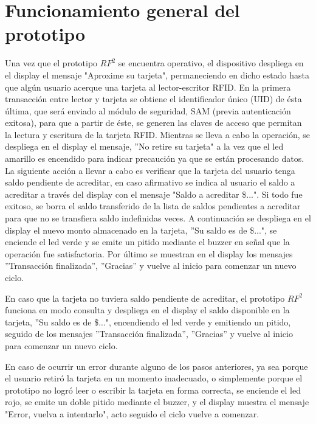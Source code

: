 \section{Funcionamiento general del prototipo}
Una vez que el prototipo $RF^{2}$ se encuentra operativo, el dispositivo despliega en el display el mensaje "Aproxime su tarjeta", permaneciendo en dicho estado hasta que algún usuario acerque una tarjeta al lector-escritor RFID. 
En la primera transacción entre lector y tarjeta se obtiene el identificador único (UID) de ésta última, que será enviado al módulo de seguridad, SAM (previa autenticación exitosa), para que a partir de éste, se generen las claves de acceso que permitan la lectura y escritura de la tarjeta RFID.
Mientras se lleva a cabo la operación, se despliega en el display el mensaje, ”No retire su tarjeta" a la vez que el led amarillo es encendido para indicar precaución ya que se están procesando datos.
La siguiente acción a llevar a cabo es verificar que la tarjeta del usuario tenga saldo pendiente de acreditar, en caso afirmativo se indica al usuario el saldo a acreditar a través del display con el mensaje "Saldo a acreditar \$...". Si todo fue exitoso, se borra el saldo transferido de la lista de saldos pendientes a acreditar para que no se transfiera saldo indefinidas veces.
A continuación se despliega en el display el nuevo monto almacenado en la tarjeta, ”Su saldo es de \$...", se enciende el led verde y se emite un pitido mediante el buzzer en señal que la operación fue satisfactoria.
Por último se muestran en el display los mensajes ”Transacción finalizada”, ”Gracias” y vuelve al inicio para comenzar un nuevo ciclo.

En caso que la tarjeta no tuviera saldo pendiente de acreditar, el prototipo $RF^{2}$ funciona en modo consulta y despliega en el display el saldo disponible en la tarjeta, ”Su saldo es de \$...", encendiendo el led verde y emitiendo un pitido, seguido de los mensajes ”Transacción finalizada”, ”Gracias” y vuelve al inicio para comenzar un nuevo ciclo.

En caso de ocurrir un error durante alguno de los pasos anteriores, ya sea porque
el usuario retiró la tarjeta en un momento inadecuado, o simplemente porque el prototipo
no logró leer o escribir la tarjeta en forma correcta, se enciende el led rojo, se emite un
doble pitido mediante el buzzer, y el display muestra el mensaje "Error, vuelva a intentarlo",
acto seguido el ciclo vuelve a comenzar. 

